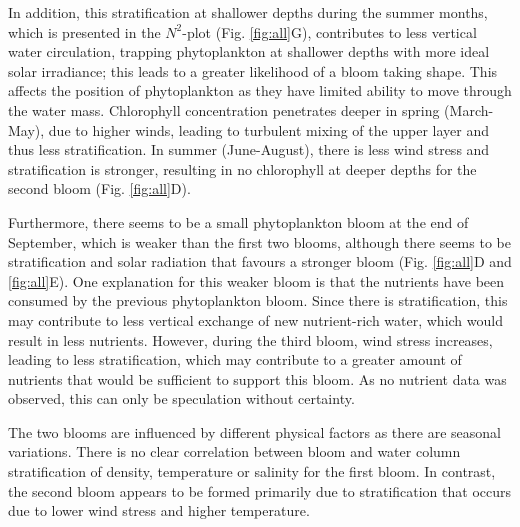 \documentclass[../Main.tex]{subfiles}
\begin{document}
In addition, this stratification at shallower depths during the summer months, which is presented in the $N^2$-plot (Fig. \ref{fig:all}G), contributes to less vertical water circulation, trapping phytoplankton at shallower depths with more ideal solar irradiance; this leads to a greater likelihood of a bloom taking shape. This affects the position of phytoplankton as they have limited ability to move through the water mass\supercite{kase2018phytoplankton}.
Chlorophyll concentration penetrates deeper in spring (March-May), due to higher winds, leading to turbulent mixing of the upper layer and thus less stratification. In summer (June-August), there is less wind stress and stratification is stronger, resulting in no chlorophyll at deeper depths for the second bloom (Fig. \ref{fig:all}D).

Furthermore, there seems to be a small phytoplankton bloom at the end of September, which is weaker than the first two blooms, although there seems to be stratification and solar radiation that favours a stronger bloom (Fig. \ref{fig:all}D and \ref{fig:all}E). One explanation for this weaker bloom is that the nutrients have been consumed by the previous phytoplankton bloom. Since there is stratification, this may contribute to less vertical exchange of new nutrient-rich water, which would result in less nutrients. However, during the third bloom, wind stress increases, leading to less stratification, which may contribute to a greater amount of nutrients that would be sufficient to support this bloom.  As no nutrient data was observed, this can only be speculation without certainty. 

The two blooms are influenced by different physical factors as there are seasonal variations. There is no clear correlation between bloom and water column stratification of density, temperature or salinity for the first bloom. In contrast, the second bloom appears to be formed primarily due to stratification that occurs due to lower wind stress and higher temperature.
\end{document}

